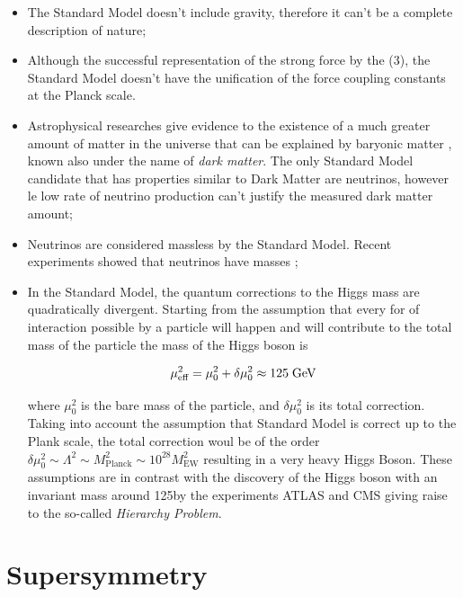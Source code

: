 \begin{itemize}
	\item The Standard Model doesn't include gravity, therefore it can't be a complete description of nature;
	\item Although the successful representation of the strong force by the (3), the Standard Model doesn't have the unification of the force coupling constants at the Planck scale.
	\item Astrophysical researches give evidence to the existence of a much greater amount of matter in the universe that can be explained by baryonic matter \cite{deBoer:2005tm}, known also under the name of \textit{dark matter}. The only Standard Model candidate that has properties similar to Dark Matter are neutrinos, however le low rate of neutrino production can't justify the measured dark matter amount;
	\item Neutrinos are considered massless by the Standard Model. Recent experiments showed that neutrinos have masses \cite{Fukuda:1998mi};
	\item In the Standard Model, the quantum corrections to the Higgs mass are quadratically divergent. Starting from the assumption that every for of interaction possible by a particle will happen and will contribute to the total mass of the particle the mass of the Higgs boson is 
	
	\begin{equation}
	\mu^{2}_{\text{eff}} = \mu^{2}_{0} + \delta\mu^{2}_{0} \approx 125\;\text{Ge}\kern-0.06667em\text{V}
	\end{equation}
	
	where $\mu^{2}_{0}$ is the bare mass of the particle, and $\delta\mu^{2}_{0} $ is its total correction. Taking into account the assumption that Standard Model is correct up to the Plank scale, the total correction woul be of the order  $\delta\mu^{2}_{0}  \sim \Lambda^{2} \sim M^{2}_{\text{Planck}} \sim 10^{28}M^{2}_{\text{EW}}$ resulting in a very heavy Higgs Boson. These assumptions are in contrast with the discovery of the Higgs boson with an invariant mass around 125\gev by the experiments ATLAS \cite{Aad:2012tfa} and CMS \cite{Chatrchyan:2012xdj} giving raise to the so-called \textit{Hierarchy Problem}.
	
\end{itemize}

\clearpage

\section{Supersymmetry}

